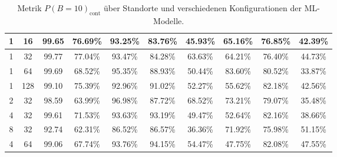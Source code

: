 \begin{table}[h!]
\begin{tabular}{ | c | c | c | c | c | c | c | c | c | c | }
        1 & 16 & 99.65 & 76.69\% & 93.25\% & 83.76\% & 45.93\% & 65.16\% & 76.85\% & 42.39\% \\\hline
        1 & 32 & 99.77 & 77.04\% & 93.47\% & 84.28\% & 63.63\% & 64.21\% & 76.40\% & 44.73\% \\\hline
        1 & 64 & 99.69 & 68.52\% & 95.35\% & 88.93\% & 50.44\% & 83.60\% & 80.52\% & 33.87\% \\\hline
        1 & 128 & 99.10 & 75.39\% & 92.96\% & 91.02\% & 52.27\% & 55.62\% & 82.18\% & 42.56\% \\\hline
        2 & 32 & 98.59 & 63.99\% & 96.98\% & 87.72\% & 68.52\% & 73.21\% & 79.07\% & 35.48\% \\\hline
        4 & 32 & 99.61 & 71.53\% & 93.63\% & 93.19\% & 49.47\% & 52.64\% & 82.16\% & 38.66\% \\\hline
        8 & 32 & 92.74 & 62.31\% & 86.52\% & 86.57\% & 36.36\% & 71.92\% & 75.98\% & 51.15\% \\\hline
        4 & 64 & 99.06 & 67.74\% & 93.76\% & 94.15\% & 54.47\% & 47.75\% & 82.08\% & 47.55\% \\\hline
    \end{tabular}
    \caption{Metrik $P(B=10)_{\text{cont}}$ über Standorte und verschiedenen Konfigurationen der ML-Modelle.}
    \label{tab:predictions_by_acc_10_cont}
\end{table}
